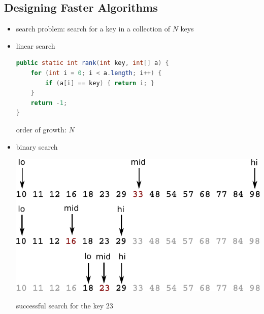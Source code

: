 \documentclass[8pt,a4paper,compress]{beamer}
\begin{document}
\subsection*{Designing Faster Algorithms}
\begin{frame}[fragile]
\begin{itemize}
\item search problem: search for a key in a collection of $N$ keys

\item linear search
\begin{lstlisting}[language=Java]
public static int rank(int key, int[] a) {
    for (int i = 0; i < a.length; i++) {
        if (a[i] == key) { return i; }
    }
    return -1;
}
\end{lstlisting}

order of growth: $N$
 
\item binary search
\begin{center}
\includegraphics[scale=0.65]{./figures/bs1.pdf}

\smallskip

successful search for the key 23
\end{center}
\end{itemize}
\end{frame}
\end{document}
